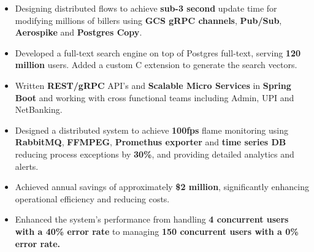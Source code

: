 \documentclass[10pt,a4paper,ragged2e]{classes/altacv}
\begin{document}
\tagline{ }

\begin{fullwidth}
\makecvheader
\end{fullwidth}






\begin{itemize}[itemsep=5pt]
\normalsize

\item Designing distributed flows to achieve \textbf{sub-3 second} update time for modifying millions of billers using \textbf{GCS gRPC channels}, \textbf{Pub/Sub}, \textbf{Aerospike} and \textbf{Postgres Copy}.

\item Developed a full-text search engine on top of Postgres full-text, serving \textbf{120 million} users. Added a custom C extension to generate the search vectors.

\item Written \textbf{REST/gRPC} API's and \textbf{Scalable Micro Services} in \textbf{Spring Boot} and working with cross functional teams including Admin, UPI and NetBanking.

\end{itemize}

\vspace{3pt}

\begin{itemize}[itemsep=5pt]
\normalsize

\item Designed a distributed system to achieve \textbf{100fps} flame monitoring using \textbf{RabbitMQ}, \textbf{FFMPEG}, \textbf{Promethus exporter} and \textbf{time series DB} reducing process exceptions by \textbf{30\%}, and providing detailed analytics and alerts.


\item Achieved annual savings of approximately \textbf{\$2 million}, significantly enhancing operational efficiency and reducing costs.

\item Enhanced the system's performance from handling \textbf{4 concurrent users with a 40\% error rate} to managing \textbf{150 concurrent users with a 0\% error rate.}

\end{itemize}
\end{document}

